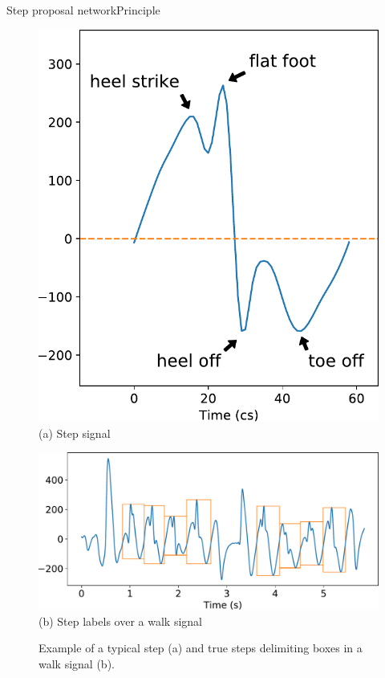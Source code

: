 \documentclass[8pt,t,aspectratio=1610]{beamer}
\begin{document}
\begin{frame}{Step proposal network}{Principle}
\begin{figure}[h]
    \centering
    \begin{minipage}[t]{0.45\linewidth}
        \centering
        \includegraphics[width=0.6\linewidth]{example_step.pdf}\\
        {\small (a)\; Step signal}
    \end{minipage}\hfill
    \begin{minipage}[t]{0.55\linewidth}
        \centering
        \includegraphics[width=\linewidth]{signal_walk_young_female_stepboxes.pdf}\\
        {\small (b)\; Step labels over a walk signal}
    \end{minipage}
    \caption{Example of a typical step (a) and true steps delimiting boxes in a walk signal (b).}
\end{figure}
\end{frame}
\end{document}
